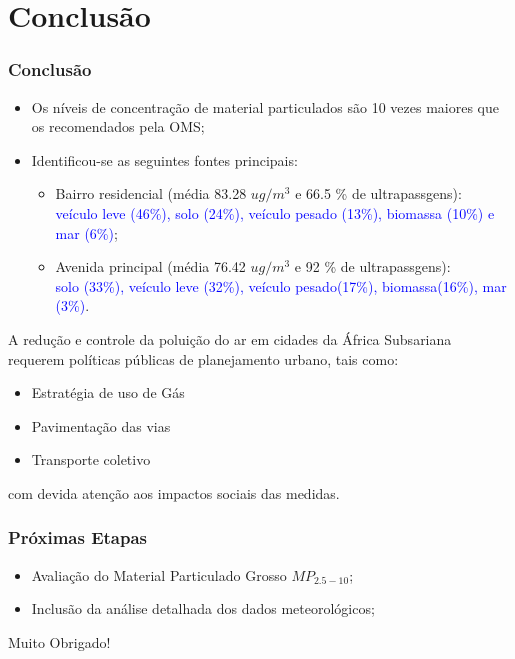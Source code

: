 \section{Conclusão}

\begin{frame}
  \frametitle{Conclusão}
  \begin{itemize}
    \item Os níveis de concentração de material particulados são 10 vezes maiores que os recomendados pela OMS;
    \item Identificou-se as seguintes fontes principais:
         \begin{itemize}
           \item Bairro residencial (média 83.28 $ug/m^3$ e 66.5 \% de ultrapassgens): \\
                 \textcolor{blue}{veículo leve (46\%), solo (24\%), veículo pesado (13\%), biomassa (10\%) e mar (6\%)};
           \item Avenida principal (média 76.42 $ug/m^3$ e 92 \% de ultrapassgens): \\
                 \textcolor{blue}{solo (33\%), veículo leve (32\%), veículo pesado(17\%), biomassa(16\%), mar (3\%)}.
         \end{itemize}
  \end{itemize}
\end{frame}


\begin{frame}
  A redução e controle da poluição do ar em cidades da África Subsariana requerem políticas públicas de planejamento urbano, tais como:
  \begin{itemize}
    \item Estratégia de uso de Gás
    \item Pavimentação das vias
    \item Transporte coletivo
  \end{itemize}
com devida atenção aos impactos sociais das medidas.
\end{frame}

\begin{frame}
  \frametitle{Próximas Etapas}
  \begin{itemize}
    \item Avaliação do Material Particulado Grosso $MP_{2.5-10}$;
    \item Inclusão da análise detalhada dos dados meteorológicos;
  \end{itemize}
\end{frame}

\begin{frame}
  Muito Obrigado!
\end{frame}
